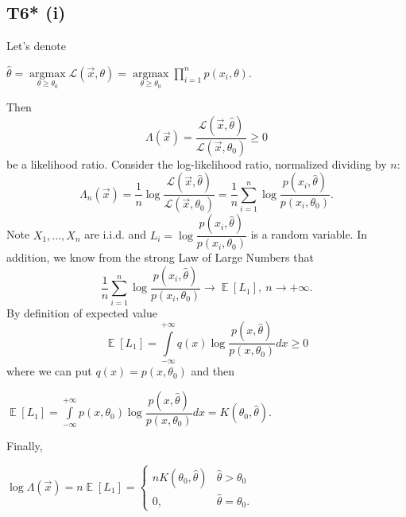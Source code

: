 \documentclass[a4paper, 12pt]{article}
\DeclareMathOperator*{\E}{\mathbb{E}}
\DeclareMathOperator*{\argmax}{\text{argmax}}
\begin{document}
\subsection*{T6* (i)}
Let's denote
\begin{tcolorbox}
[enhanced,width=\textwidth,center upper,
 fontupper=\large\bfseries,
 drop fuzzy shadow southeast,
 colframe=red!50!black,colback=yellow!25]
$
\hat{\theta} = \argmax \limits_{\theta \geqslant \theta_0} \mathcal{L}(\vec{x}, \theta) = \argmax \limits_{\theta \geqslant \theta_0} \prod \limits_{i=1}^n p(x_i, \theta).
$
\end{tcolorbox}
Then 
\begin{equation}
\label{lab1}
\Lambda(\vec{x}) = \dfrac{\mathcal{L}(\vec{x}, \hat{\theta})}{\mathcal{L}(\vec{x}, \theta_0)} \geqslant 0
\end{equation}
be a likelihood ratio.
Consider the log-likelihood ratio, normalized dividing by $n:$
$$
\Lambda_n(\vec{x}) = \dfrac{1}{n} \log \dfrac{\mathcal{L}(\vec{x}, \hat{\theta})}{\mathcal{L}(\vec{x}, \theta_0)} = \dfrac{1}{n} \sum \limits_{i=1}^n \log \dfrac{p(x_i, \hat{\theta})}{p(x_i, \theta_0)}.
$$
Note $X_1, \ldots, X_n$ are i.i.d. and $L_i = \log \dfrac{p(x_i, \hat{\theta})}{p(x_i, \theta_0)}$ is a random variable. In addition, we know from the strong Law of Large Numbers that
$$
\dfrac{1}{n} \sum \limits_{i=1}^n \log \dfrac{p(x_i, \hat{\theta})}{p(x_i, \theta_0)} \rightarrow \E [L_1], ~ n \rightarrow +\infty.
$$ 
By definition of expected value
$$ 
\E [L_1] = \int \limits_{-\infty}^{+\infty} q(x) \log \dfrac{p(x, \hat{\theta})}{p(x, \theta_0)} dx \geqslant 0
$$
where we can put $q(x) = p(x, \theta_0)$ and then
\begin{tcolorbox}
[enhanced,width=\textwidth,center upper,
 fontupper=\large\bfseries,
 drop fuzzy shadow southeast,
 colframe=red!50!black,colback=yellow!25]
$
\E [L_1] = \int \limits_{-\infty}^{+\infty} p(x, \theta_0) \log \dfrac{p(x, \hat{\theta})}{p(x, \theta_0)} dx = K(\theta_0, \hat{\theta}).
$
\end{tcolorbox}
Finally, 
\begin{tcolorbox}
[enhanced,width=\textwidth,center upper,
 fontupper=\large\bfseries,
 drop fuzzy shadow southeast,
 colframe=red!50!black,colback=yellow!25]
$
\log \Lambda(\vec{x}) = n \E [L_1] = 
\begin{cases}
n K(\theta_0, \hat{\theta}) & \hat{\theta} > \theta_0 \\
0, & \hat{\theta} = \theta_0.
\end{cases}
$
\end{tcolorbox}
\end{document}
